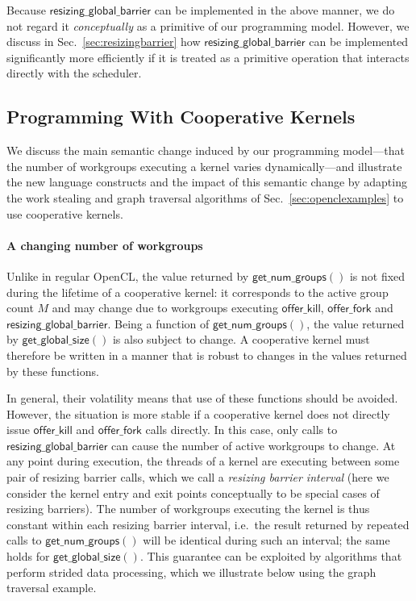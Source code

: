 \documentclass[numbers,nocopyrightspace,10pt]{sigplanconf}
\newcommand{\mysec}{Sec.~}
\newcommand{\offerfork}{\mathsf{offer\_fork}}
\newcommand{\offerkill}{\mathsf{offer\_kill}}
\newcommand{\resizingglobalbarrier}{\mathsf{resizing\_global\_barrier}}
\newcommand{\getnumgroups}{\mathsf{get\_num\_groups}}
\newcommand{\getglobalsize}{\mathsf{get\_global\_size}}
\begin{document}
Because $\resizingglobalbarrier$ can be implemented in the above
manner, we do not regard it \emph{conceptually} as a primitive of our
programming model.  However, we discuss in
\mysec\ref{sec:resizingbarrier} how $\resizingglobalbarrier$ can be
implemented significantly more efficiently if it is treated as a
primitive operation that interacts directly with the scheduler.

\subsection{Programming With Cooperative Kernels}\label{sec:programmingguidelines}

We discuss the main semantic change induced by our programming
model---that the number of workgroups executing a kernel varies
dynamically---and illustrate the new language constructs and the
impact of this semantic change by adapting the work stealing and graph
traversal algorithms of \mysec\ref{sec:openclexamples} to use
cooperative kernels.

\paragraph{A changing number of workgroups}  Unlike in regular OpenCL,
the value returned by $\getnumgroups()$ is not fixed during the
lifetime of a cooperative kernel: it corresponds to the active group count $M$ and may change due to workgroups executing
$\offerkill$, $\offerfork$ and $\resizingglobalbarrier$.  Being a function of $\getnumgroups()$, the value returned by $\getglobalsize()$
is also subject to change.
A cooperative kernel must therefore be written in a manner that is
robust to changes in the values returned by these functions.

In general, their volatility means that use of these functions should be avoided.
However, the situation is more stable if a cooperative kernel does not directly
issue $\offerkill$ and $\offerfork$ calls directly.  In this case,
only calls to $\resizingglobalbarrier$ can cause the number of active
workgroups to change.  At any point
during execution, the threads of a kernel are executing between some
pair of resizing barrier calls, which we call a \emph{resizing barrier
  interval} (here we consider the kernel entry and exit points
conceptually to be special cases of resizing barriers).  The number of
workgroups executing the kernel is thus constant within each resizing
barrier interval, i.e.\ the result returned by repeated calls to
$\getnumgroups()$ will be identical during such an interval; the same holds for $\getglobalsize()$.
%
This guarantee can be exploited by algorithms that perform strided
data processing, which we illustrate below using the graph traversal
example.
\end{document}
